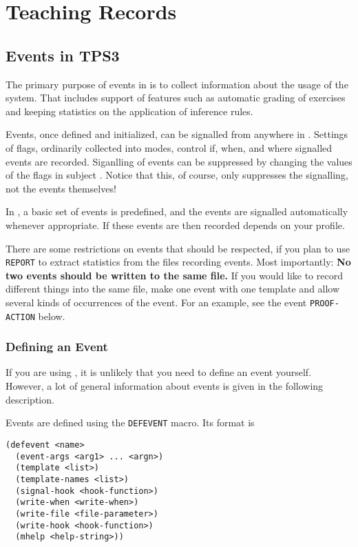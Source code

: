 \chapter{Teaching Records}\label{Teach}

\section{Events in TPS3}

The primary purpose of events in \TPS is to collect information about
the usage of the system.  That includes support of features such as
automatic grading of exercises and keeping statistics on the application of
inference rules.

Events, once defined and initialized, can be signalled from anywhere in
\tps.  Settings of flags, ordinarily collected into modes, control if,
when, and where signalled events are recorded. Siganlling of events can 
be suppressed by changing the values of the flags in subject .
Notice that this, of course, only suppresses the signalling, not the events
themselves!

In \ETPS, a basic set of events is predefined, and the events are signalled
automatically whenever appropriate.  If these events are then recorded
depends on your \ETPS profile.

There are some restrictions on events that should be respected, if
you plan to use {\tt REPORT} to extract statistics from the files recording
events.  Most importantly: {\bf No two events should be written to the
same file.}  If you would like to record different things into the
same file, make one event with one template and allow several kinds of
occurrences of the event.  For an example, see the event {\tt PROOF-ACTION}
below.

\subsection{Defining an Event}

If you are using \ETPS, it is unlikely that you need to define an event
yourself.  However, a lot of general information about events is given
in the following description.

Events are defined using the {\tt DEFEVENT} macro.
Its format is

\begin{verbatim}
(defevent <name>
  (event-args <arg1> ... <argn>)
  (template <list>)
  (template-names <list>)
  (signal-hook <hook-function>)
  (write-when <write-when>)
  (write-file <file-parameter>)
  (write-hook <hook-function>)
  (mhelp <help-string>))
\end{verbatim}

